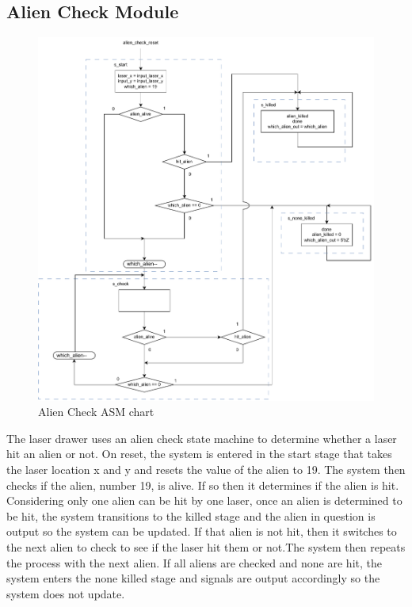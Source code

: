 \documentclass[11pt, titlepage]{article}
\begin{document}
        \subsection{Alien Check Module}
            \begin{figure}[H]
                \centering
                \includegraphics[scale = 0.57]{Images/Alien Check ASM.pdf}
                \caption{Alien Check ASM chart}
            \end{figure}
            The laser drawer uses an alien check state machine to determine whether a laser hit an alien or not. On reset, the system is entered in the start stage that takes the laser location x and y and resets the value of the alien to 19. The system then checks if the alien, number 19, is alive. If so then it determines if the alien is hit. Considering only one alien can be hit by one laser, once an alien is determined to be hit, the system transitions to the killed stage and the alien in question is output so the system can be updated. If that alien is not hit, then it switches to the next alien to check to see if the laser hit them or not.The system then repeats the process with the next alien. If all aliens are checked and none are hit, the system enters the none killed stage and signals are output accordingly so the system does not update.
\end{document}
